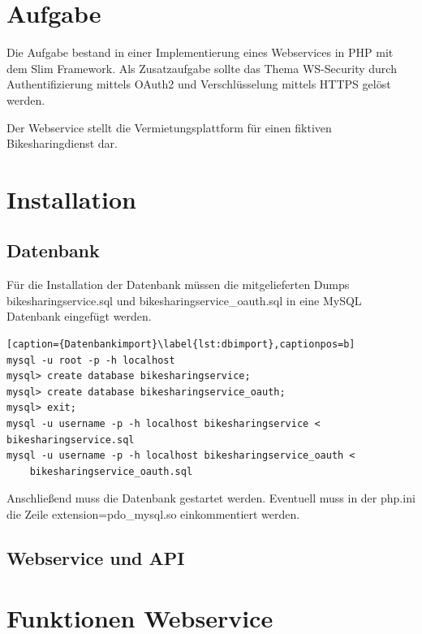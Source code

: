 \chapter{Aufgabe}

Die Aufgabe bestand in einer Implementierung eines Webservices in PHP mit dem Slim Framework.
Als Zusatzaufgabe sollte das Thema WS-Security durch Authentifizierung mittels OAuth2 und Verschlüsselung mittels HTTPS gelöst werden.

Der Webservice stellt die Vermietungsplattform für einen fiktiven Bikesharingdienst dar.

\chapter{Installation}
\section{Datenbank}
Für die Installation der Datenbank müssen die mitgelieferten Dumps bikesharingservice.sql und bikesharingservice\_oauth.sql in eine MySQL Datenbank eingefügt werden.
\begin{lstlisting}[caption={Datenbankimport}\label{lst:dbimport},captionpos=b] 
mysql -u root -p -h localhost
mysql> create database bikesharingservice;
mysql> create database bikesharingservice_oauth;
mysql> exit;
mysql -u username -p -h localhost bikesharingservice < bikesharingservice.sql
mysql -u username -p -h localhost bikesharingservice_oauth < 
	bikesharingservice_oauth.sql
\end{lstlisting}
Anschließend muss die Datenbank gestartet werden.
Eventuell muss in der php.ini die Zeile extension=pdo\_mysql.so einkommentiert werden.

\section{Webservice und API}

\chapter{Funktionen Webservice}


